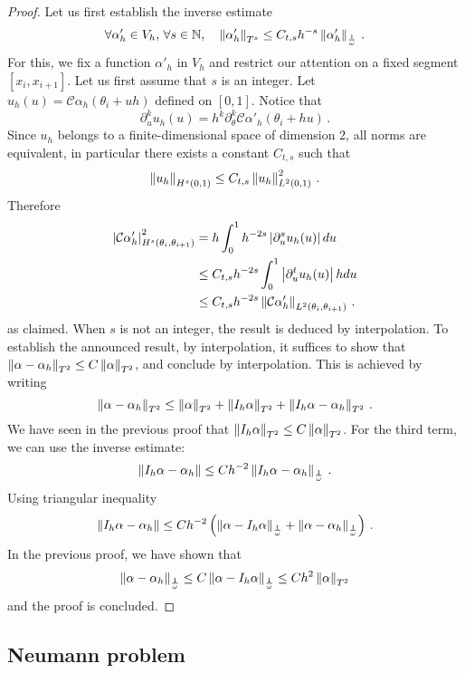 \documentclass[a4paper]{article}
\begin{document}
	\begin{proof}
		Let us first establish the inverse estimate
		\[\forall \alpha'_h \in V_h, \, \forall s \in \mathbb{N}, \quad  \left\|\alpha'_h\right\|_{T^s} \leq C_{t,s} h^{- s} \left\|\alpha'_h\right\|_{\frac{1}{\omega}}\,.\]
		For this, we fix a function $\alpha'_h$ in $V_h$ and restrict our attention on a fixed segment $[x_i,x_{i+1}]$. Let us first assume that $s$ is an integer. Let $u_h(u) = \mathcal{C}\alpha_h(\theta_i + u h)$ defined on $[0,1]$. Notice that 
		\[\partial_u^k u_h(u) = h^k \partial_\theta^k \mathcal{C} \alpha'_h(\theta_i + hu)\,.\] 
		Since $u_h$ belongs to a finite-dimensional space of dimension $2$, all norms are equivalent, in particular there exists a constant $C_{t,s}$ such that
		\[\left\|u_h\right\|_{H^s(0,1)} \leq C_{t,s} \left\|u_h\right\|_{L^2(0,1)}^2\,.\]
		Therefore
		\[
		\begin{split}
			\left\lvert \mathcal{C}\alpha'_h \right\rvert_{H^s(\theta_i,\theta_{i+1})}^2& = h\int_{0}^{1}h^{-2s}\left\lvert \partial_u^s u_h(u) \right\rvert du \\
			 &\leq C_{t,s} h^{-2s} \int_{0}^1 \left\lvert \partial_u^t u_h(u) \right\rvert h du\\
			&\leq C_{t,s}h^{-2s}\left\|\mathcal{C}\alpha'_h\right\|_{L^2(\theta_i,\theta_{i+1})}\,.
		\end{split} \]
		as claimed. When $s$ is not an integer, the result is deduced by interpolation. To establish the announced result, by interpolation, it suffices to show that $\left\|\alpha - \alpha_h\right\|_{T^2} \leq C \left\|\alpha\right\|_{T^2}$, and conclude by interpolation. This is achieved by writing
		\[\left\|\alpha - \alpha_h\right\|_{T^2} \leq \left\|\alpha\right\|_{T^2} + \left\|I_h \alpha\right\|_{T^2} + \left\|I_h \alpha - \alpha_h\right\|_{T^2}\,.\]
		We have seen in the previous proof that $\left\|I_h \alpha\right\|_{T^2} \leq C \left\|\alpha\right\|_{T^2}$. For the third term, we can use the inverse estimate:
		\[\left\|I_h \alpha - \alpha_h\right\| \leq Ch^{-2}\left\|I_h \alpha - \alpha_h\right\|_{\frac{1}{\omega}}\,.\]
		Using triangular inequality
		\[\left\|I_h \alpha - \alpha_h\right\| \leq Ch^{-2}\left(\left\|\alpha - I_h \alpha\right\|_{\frac{1}{\omega}} + \left\|\alpha - \alpha_h\right\|_\frac{1}{\omega}\right)\,.\]
		In the previous proof, we have shown that 
		\[\left\|\alpha - \alpha_h\right\|_{\frac{1}{\omega}} \leq C \left\|\alpha - I_h \alpha\right\|_{\frac{1}{\omega}} \leq Ch^2 \left\|\alpha\right\|_{T^2}\]
		and the proof is concluded. 
	\end{proof}
	
\subsection{Neumann problem}
\end{document}
